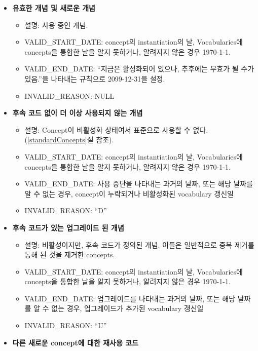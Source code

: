 \documentclass[11pt]{book}
\providecommand{\tightlist}{%
  \setlength{\itemsep}{0pt}\setlength{\parskip}{0pt}}
\theoremstyle{definition}
\theoremstyle{definition}
\theoremstyle{definition}
\theoremstyle{remark}
\begin{document}
\begin{itemize}
\tightlist
\item
  \textbf{유효한 개념 및 새로운 개념}

  \begin{itemize}
  \tightlist
  \item
    설명: 사용 중인 개념.
  \item
    VALID\_START\_DATE: concept의 instantiation의 날, Vocabularies에
    concepts을 통합한 날을 알지 못하거나, 알려지지 않은 경우 1970-1-1.
  \item
    VALID\_END\_DATE: ``지금은 활성화되어 있으나, 추후에는 무효가 될
    수가 있음.''을 나타내는 규칙으로 2099-12-31을 설정.
  \item
    INVALID\_REASON: NULL
  \end{itemize}
\item
  \textbf{후속 코드 없이 더 이상 사용되지 않는 개념}

  \begin{itemize}
  \tightlist
  \item
    설명: Concept이 비활성화 상태여서 표준으로 사용할 수 없다.
    (\ref{standardConcepts}절 참조).
  \item
    VALID\_START\_DATE: concept의 instantiation의 날, Vocabularies에
    concepts을 통합한 날을 알지 못하거나, 알려지지 않은 경우 1970-1-1.
  \item
    VALID\_END\_DATE: 사용 중단을 나타내는 과거의 날짜, 또는 해당 날짜를
    알 수 없는 경우, concept이 누락되거나 비활성화된 vocabulary 갱신일
  \item
    INVALID\_REASON: ``D''
  \end{itemize}
\item
  \textbf{후속 코드가 있는 업그레이드 된 개념}

  \begin{itemize}
  \tightlist
  \item
    설명: 비활성이지만, 후속 코드가 정의된 개념. 이들은 일반적으로 중복
    제거를 통해 된 것을 제거한 concepts.
  \item
    VALID\_START\_DATE: concept의 instantiation의 날, Vocabularies에
    concepts을 통합한 날을 알지 못하거나, 알려지지 않은 경우 1970-1-1.
  \item
    VALID\_END\_DATE: 업그레이드를 나타내는 과거의 날짜, 또는 해당
    날짜를 알 수 없는 경우, 업그레이드가 추가된 vocabulary 갱신일
  \item
    INVALID\_REASON: ``U''
  \end{itemize}
\item
  \textbf{다른 새로운 concept에 대한 재사용 코드}


\end{itemize}
\end{document}
